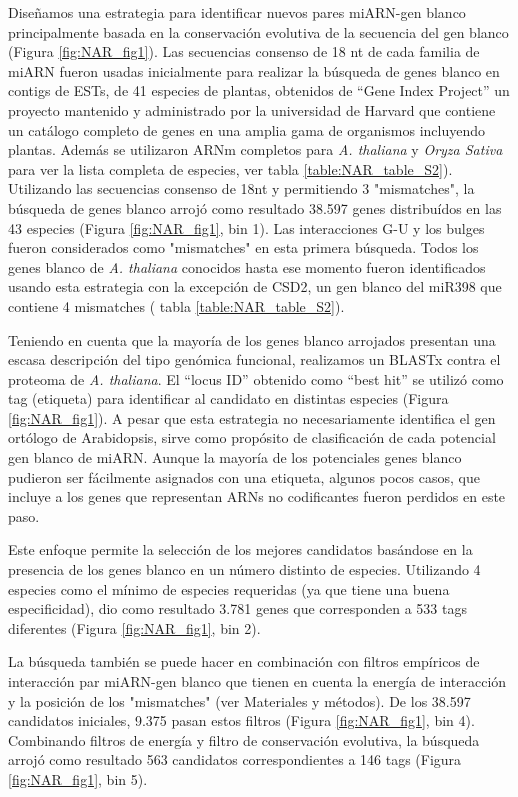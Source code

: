 Diseñamos una estrategia para identificar nuevos pares miARN-gen blanco principalmente basada en la conservación evolutiva de la secuencia del gen blanco (Figura \ref{fig:NAR_fig1}).
Las secuencias consenso de 18 nt de cada familia de miARN fueron usadas inicialmente para realizar la búsqueda de genes blanco en contigs de ESTs, de 41 especies de plantas, obtenidos de “Gene Index Project” un proyecto mantenido y administrado por la universidad de Harvard que contiene un catálogo completo de genes en una amplia gama de organismos incluyendo plantas.
Además se utilizaron ARNm completos para \textit{A. thaliana} y \textit{Oryza Sativa} para ver la lista completa de especies, ver tabla \ref{table:NAR_table_S2}).
Utilizando las secuencias consenso de 18nt y permitiendo 3 "mismatches", la búsqueda de genes blanco arrojó como resultado 38.597 genes distribuídos en las 43 especies (Figura \ref{fig:NAR_fig1}, bin 1).
Las interacciones G-U y los bulges fueron considerados como "mismatches" en esta primera búsqueda. Todos los genes blanco de  \textit{A. thaliana} conocidos hasta ese momento fueron identificados usando esta estrategia con la excepción de CSD2, un gen blanco del miR398 que contiene 4 mismatches ( tabla \ref{table:NAR_table_S2}).

Teniendo en cuenta que la mayoría de los genes blanco arrojados presentan una escasa descripción del tipo genómica funcional, realizamos un BLASTx  contra el proteoma de \textit{A. thaliana}.
El “locus ID” obtenido como “best hit” se utilizó como tag (etiqueta) para identificar al candidato en distintas especies (Figura \ref{fig:NAR_fig1}).
A pesar que esta estrategia no necesariamente identifica el gen ortólogo de Arabidopsis, sirve como propósito de clasificación de cada potencial gen blanco de miARN.
Aunque la mayoría de los potenciales genes blanco pudieron ser fácilmente asignados con una etiqueta, algunos pocos casos, que incluye a los genes que representan ARNs no codificantes fueron perdidos en este paso.

Este enfoque permite la selección de los mejores candidatos basándose en la presencia de los genes blanco en un número distinto de especies.
Utilizando 4 especies como el mínimo de especies requeridas (ya que tiene una buena especificidad), dio como resultado 3.781 genes que corresponden a 533 tags diferentes (Figura \ref{fig:NAR_fig1}, bin 2).

La búsqueda también se puede hacer en combinación con filtros empíricos de interacción par miARN-gen blanco que tienen en cuenta la energía de interacción y la posición de los "mismatches" (ver Materiales y métodos).
De los 38.597 candidatos iniciales, 9.375 pasan estos filtros (Figura \ref{fig:NAR_fig1}, bin 4).
Combinando filtros de energía y filtro de conservación evolutiva, la búsqueda arrojó como resultado 563 candidatos correspondientes a 146 tags (Figura \ref{fig:NAR_fig1}, bin 5).


